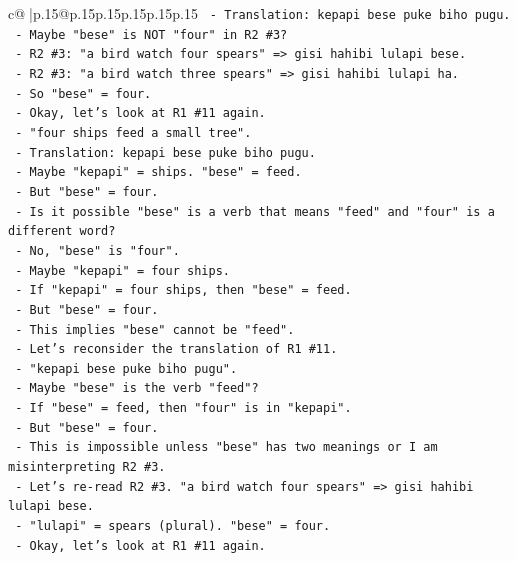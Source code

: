 \documentclass{article}
\begin{document}
{\begin{supertabular}{c@{$\;$}|p{.15\linewidth}@{}p{.15\linewidth}p{.15\linewidth}p{.15\linewidth}p{.15\linewidth}p{.15\linewidth}}
{{{\texttt{        {-} Translation: kepapi bese puke biho pugu.} \\
\texttt{        {-} Maybe "bese" is NOT "four" in R2 \#3?} \\
\texttt{        {-} R2 \#3: "a bird watch four spears" => gisi hahibi lulapi bese.} \\
\texttt{        {-} R2 \#3: "a bird watch three spears" => gisi hahibi lulapi ha.} \\
\texttt{        {-} So "bese" = four.} \\
\texttt{        {-} Okay, let's look at R1 \#11 again.} \\
\texttt{        {-} "four ships feed a small tree".} \\
\texttt{        {-} Translation: kepapi bese puke biho pugu.} \\
\texttt{        {-} Maybe "kepapi" = ships. "bese" = feed.} \\
\texttt{        {-} But "bese" = four.} \\
\texttt{        {-} Is it possible "bese" is a verb that means "feed" and "four" is a different word?} \\
\texttt{        {-} No, "bese" is "four".} \\
\texttt{        {-} Maybe "kepapi" = four ships.} \\
\texttt{        {-} If "kepapi" = four ships, then "bese" = feed.} \\
\texttt{        {-} But "bese" = four.} \\
\texttt{        {-} This implies "bese" cannot be "feed".} \\
\texttt{        {-} Let's reconsider the translation of R1 \#11.} \\
\texttt{        {-} "kepapi bese puke biho pugu".} \\
\texttt{        {-} Maybe "bese" is the verb "feed"?} \\
\texttt{        {-} If "bese" = feed, then "four" is in "kepapi".} \\
\texttt{        {-} But "bese" = four.} \\
\texttt{        {-} This is impossible unless "bese" has two meanings or I am misinterpreting R2 \#3.} \\
\texttt{        {-} Let's re{-}read R2 \#3. "a bird watch four spears" => gisi hahibi lulapi bese.} \\
\texttt{        {-} "lulapi" = spears (plural). "bese" = four.} \\
\texttt{        {-} Okay, let's look at R1 \#11 again.} \\
}}}
\end{supertabular}}
\end{document}
